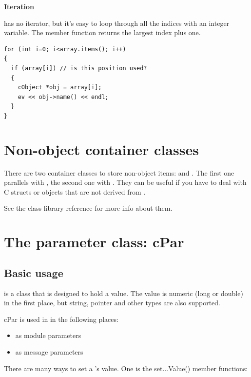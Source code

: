 \textbf{Iteration}


 has no iterator, but it's easy to loop through all the
indices with an integer variable. The  member function
returns the largest index plus one.

\begin{verbatim}
for (int i=0; i<array.items(); i++)
{
  if (array[i]) // is this position used?
  {
    cObject *obj = array[i];
    ev << obj->name() << endl;
  }
}
\end{verbatim}




\section{Non-object container classes}

There are two container classes to store non-object
items:  and
.  The first one parallels with , the
second one with . They can be useful if you have to
deal with C structs or objects that are not derived from
.

See the class library reference for more info about them.





\section{The parameter class: cPar}

\subsection{Basic usage}

 is a class that is designed to hold a value. The value
is numeric (long or double) in the first place, but string, pointer
and other types are also supported.

cPar is used in {\opp} in the following places:

\begin{itemize}
  \item{as module parameters}
  \item{as message parameters}
\end{itemize}

There are many ways to set a 's value. One is the set...Value()
member functions:

